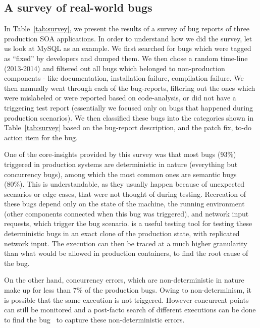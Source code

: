 \subsection{A survey of real-world bugs}
\label{sec:parikshanSurvey}
\noindent

In Table~\ref{tab:survey}, we present the results of a survey of bug reports of three production SOA applications.
In order to understand how we did the survey, let us look at MySQL as an example.
We first searched for bugs which were tagged as ``fixed'' by developers and dumped them.
We then chose a random time-line (2013-2014) and filtered out all bugs which belonged to non-production components - like documentation, installation failure, compilation failure.
We then manually went through each of the bug-reports, filtering out the ones which were mislabeled or were reported based on code-analysis, or did not have a triggering test report (essentially we focused only on bugs that happened during production scenarios).
We then classified these bugs into the categories shown in Table~\ref{tab:survey} based on the bug-report description, and the patch fix, to-do action item for the bug.

One of the core-insights provided by this survey was that most bugs (93\%) triggered in production systems are deterministic in nature (everything but concurrency bugs), among which the most common ones are semantic bugs (80\%).
This is understandable, as they usually happen because of unexpected scenarios or edge cases, that were not thought of during testing.
Recreation of these bugs depend only on the state of the machine, the running environment (other components connected when this bug was triggered), and network input requests, which trigger the bug scenario.
\parikshan is a useful testing tool for testing these deterministic bugs in an exact clone of the production state, with replicated network input. 
The execution can then be traced at a much higher granularity than what would be allowed in production containers, to find the root cause of the bug. 

On the other hand, concurrency errors, which are non-deterministic in nature make up for less than 7\% of the production bugs.
Owing to non-determinism, it is possible that the same execution is not triggered. However concurrent points can still be monitored and a post-facto search of different executions can be done to find the bug~\cite{dpor,systematicDPORconcurrency} to capture these non-deterministic errors.\\ \\


